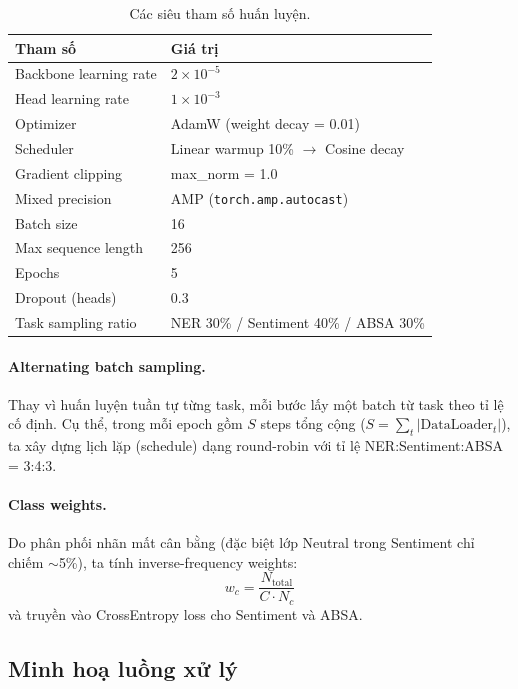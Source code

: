 \begin{table}[H]
\centering
\caption{Các siêu tham số huấn luyện.}
\label{tab:hyperparams}
\begin{tabular}{ll}
\toprule
\textbf{Tham số} & \textbf{Giá trị} \\
\midrule
Backbone learning rate  & $2 \times 10^{-5}$ \\
Head learning rate      & $1 \times 10^{-3}$ \\
Optimizer               & AdamW (weight decay = 0.01) \\
Scheduler               & Linear warmup 10\% $\to$ Cosine decay \\
Gradient clipping       & max\_norm = 1.0 \\
Mixed precision         & AMP (\texttt{torch.amp.autocast}) \\
Batch size              & 16 \\
Max sequence length     & 256 \\
Epochs                  & 5 \\
Dropout (heads)         & 0.3 \\
Task sampling ratio     & NER 30\% / Sentiment 40\% / ABSA 30\% \\
\bottomrule
\end{tabular}
\end{table}

\paragraph{Alternating batch sampling.}
Thay vì huấn luyện tuần tự từng task,
mỗi bước lấy một batch từ task theo tỉ lệ cố định.
Cụ thể, trong mỗi epoch gồm $S$ steps tổng cộng
($S = \sum_t |\text{DataLoader}_t|$),
ta xây dựng lịch lặp (schedule) dạng round-robin
với tỉ lệ NER:Sentiment:ABSA = 3:4:3.

\paragraph{Class weights.}
Do phân phối nhãn mất cân bằng (đặc biệt lớp Neutral trong Sentiment chỉ chiếm $\sim$5\%),
ta tính inverse-frequency weights:
\begin{equation}
    w_c = \frac{N_{\text{total}}}{C \cdot N_c}
\end{equation}
và truyền vào CrossEntropy loss cho Sentiment và ABSA.

\subsection{Minh hoạ luồng xử lý}

